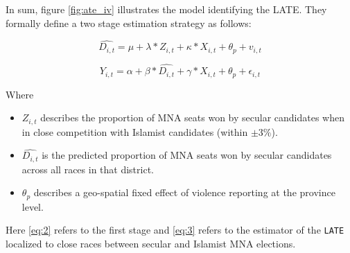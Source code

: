 \documentclass{scrartcl}
\begin{document}
In sum, figure \ref{fig:ate_iv} illustrates the model identifying the LATE.
They formally define a two stage estimation strategy as follows:

\begin{equation} \label{eq:2}
  \widehat{D_{i,t}} = \mu + \lambda * Z_{i,t} + \kappa*X_{i,t} + \theta_p + v_{i,t}
\end{equation}

 \begin{equation} \label{eq:3}
  Y_{i,t} = \alpha + \beta * \widehat{D_{i,t}} + \gamma*X_{i,t} + \theta_{p} + \epsilon_{i,t}
\end{equation}

Where

\begin{itemize}
\item $Z_{i,t}$ describes the proportion of MNA seats won by secular candidates when in close competition with Islamist candidates (within $\pm 3\%$).
\item $\widehat{D_{i,t}}$ is the predicted proportion of MNA seats won by secular candidates across all races in that district.
\item $\theta_p$ describes a geo-spatial fixed effect of violence reporting at the province level. 
\end{itemize}

Here \ref{eq:2} refers to the first stage and \ref{eq:3} refers to the estimator of the \texttt{LATE} localized to close races between secular and Islamist MNA elections.  
\end{document}

